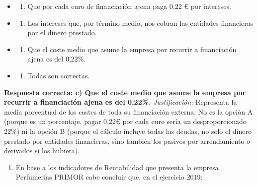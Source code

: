 \documentclass[12pt]{book} %
\providecommand{\tightlist}{%
  \setlength{\itemsep}{0pt}\setlength{\parskip}{0pt}}
\begin{document}
\begin{itemize}
\item
  \begin{enumerate}
  \def\labelenumi{\alph{enumi})}
  \tightlist
  \item
    Que por cada euro de financiación ajena paga 0,22 € por intereses.
  \end{enumerate}
\item
  \begin{enumerate}
  \def\labelenumi{\alph{enumi})}
  \setcounter{enumi}{1}
  \tightlist
  \item
    Los intereses que, por término medio, nos cobran las entidades
    financieras por el dinero prestado.
  \end{enumerate}
\item
  \begin{enumerate}
  \def\labelenumi{\alph{enumi})}
  \setcounter{enumi}{2}
  \tightlist
  \item
    Que el coste medio que asume la empresa por recurrir a financiación
    ajena es del 0,22\%.
  \end{enumerate}
\item
  \begin{enumerate}
  \def\labelenumi{\alph{enumi})}
  \setcounter{enumi}{3}
  \tightlist
  \item
    Todas son correctas.
  \end{enumerate}
\end{itemize}

\textbf{Respuesta correcta: c) Que el coste medio que asume la empresa
por recurrir a financiación ajena es del 0,22\%.} \emph{Justificación:}
Representa la media porcentual de los costes de toda su financiación
externa. No es la opción A (porque es un porcentaje, pagar 0,22€ por
cada euro sería un desproporcionado 22\%) ni la opción B (porque el
cálculo incluye todas las deudas, no solo el dinero prestado por
entidades financieras, sino también los pasivos por arrendamiento o
derivados si los hubiera).

\begin{enumerate}
\def\labelenumi{\arabic{enumi}.}
\setcounter{enumi}{10}
\tightlist
\item
  En base a los indicadores de Rentabilidad que presenta la empresa
  Perfumerías PRIMOR cabe concluir que, en el ejercicio 2019:
\end{enumerate}
\end{document}
